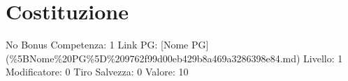 \section{Costituzione}\label{costituzione}

\begin{description}
\tightlist
\item[Tags: STAT]
No Bonus Competenza: 1 Link PG: {[}Nome PG{]}
(\%5BNome\%20PG\%5D\%209762f99d00eb429b8a469a3286398e84.md) Livello: 1
Modificatore: 0 Tiro Salvezza: 0 Valore: 10
\end{description}
